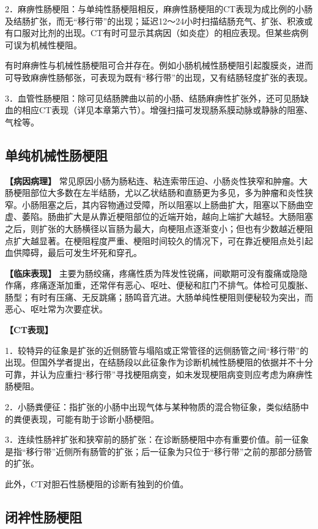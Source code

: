 2．麻痹性肠梗阻：与单纯性肠梗阻相反，麻痹性肠梗阻的CT表现为成比例的小肠及结肠扩张，而无“移行带”的出现；延迟12～24小时扫描结肠充气、扩张、积液或有口服对比剂的出现。CT有时可显示其病因（如炎症）的相应表现。但某些病例可误为机械性梗阻。

有时麻痹性与机械性肠梗阻可合并存在。例如小肠机械性肠梗阻引起腹膜炎，进而可导致麻痹性肠郁张，可表现为既有“移行带”的出现，又有结肠轻度扩张的表现。

3．血管性肠梗阻：除可见结肠脾曲以前的小肠、结肠麻痹性扩张外，还可见肠缺血的相应CT表现（详见本章第六节）。增强扫描可发现肠系膜动脉或静脉的阻塞、气栓等。

\subsection{单纯机械性肠梗阻}

\textbf{【病因病理】}
常见原因小肠为肠粘连、粘连索带压迫、小肠炎性狭窄和肿瘤。大肠梗阻部位大多数在左半结肠，尤以乙状结肠和直肠更为多见，多为肿瘤和炎性狭窄。小肠阻塞之后，其内容物通过受障，所以阻塞以上肠曲扩大，阻塞以下肠曲空虚、萎陷。肠曲扩大是从靠近梗阻部位的近端开始，越向上端扩大越轻。大肠阻塞之后，则扩张的大肠横径以盲肠为最大，向梗阻点逐渐变小；但也有少数越近梗阻点扩大越显著。在梗阻程度严重、梗阻时间较久的情况下，可在靠近梗阻点处引起血供障碍，最后可发生坏死和穿孔。

\textbf{【临床表现】}
主要为肠绞痛，疼痛性质为阵发性锐痛，间歇期可没有腹痛或隐隐作痛，疼痛逐渐加重，还常伴有恶心、呕吐、便秘和肛门不排气。体检可见腹胀、肠型；有时有压痛、无反跳痛；肠鸣音亢进。大肠单纯性梗阻则便秘较为突出，而恶心、呕吐常为次要症状。

\textbf{【CT表现】}

1．较特异的征象是扩张的近侧肠管与塌陷或正常管径的远侧肠管之间“移行带”的出现。但国外学者提出，在结肠段以此征象作为诊断机械性肠梗阻的依据并不十分可靠，并认为应重扫“移行带”寻找梗阻病变，如未发现梗阻病变则应考虑为麻痹性肠梗阻。

2．小肠粪便征：指扩张的小肠中出现气体与某种物质的混合物征象，类似结肠中的粪便表现，可能有助于诊断小肠梗阻。

3．连续性肠袢扩张和狭窄前的肠扩张：在诊断肠梗阻中亦有重要价值。前一征象是指“移行带”近侧所有肠管的扩张；后一征象为只位于“移行带”之前的那部分肠管的扩张。

此外，CT对胆石性肠梗阻的诊断有独到的价值。

\subsection{闭袢性肠梗阻}

